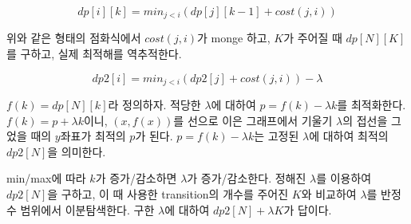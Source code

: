 $$dp[i][k] = min_{j<i} (dp[j][k-1] + cost(j, i))$$

위와 같은 형태의 점화식에서 $cost(j, i)$가 monge 하고, $K$가 주어질 때 $dp[N][K]$를 구하고, 실제 최적해를 역추적한다.

$$dp2[i] = min_{j<i} (dp2[j] + cost(j, i)) - \lambda$$

$f(k) = dp[N][k]$라 정의하자.
적당한 $\lambda$에 대하여 $p=f(k)-\lambda k$를 최적화한다.
$f(k)=p + \lambda k$이니, $(x, f(x))$를 선으로 이은 그래프에서 기울기 $\lambda$의 접선을 그었을 때의 $y$좌표가 최적의 $p$가 된다.
$p=f(k)-\lambda k$는 고정된 $\lambda$에 대하여 최적의 $dp2[N]$을 의미한다.

min/max에 따라 $k$가 증가/감소하면 $\lambda$가 증가/감소한다.
정해진 $\lambda$를 이용하여 $dp2[N]$을 구하고, 이 때 사용한 transition의 개수를 주어진 $K$와 비교하여 $\lambda$를 반정수 범위에서 이분탐색한다.
구한 $\lambda$에 대하여 $dp2[N]+\lambda K$가 답이다.
